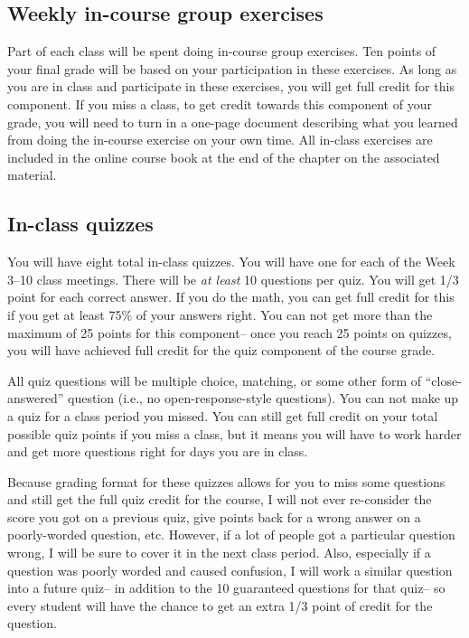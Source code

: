 \documentclass[]{book}
\begin{document}
\hypertarget{weekly-in-course-group-exercises}{%
\subsection{Weekly in-course group exercises}\label{weekly-in-course-group-exercises}}

Part of each class will be spent doing in-course group exercises. Ten points of your final grade will be based on your participation in these exercises. As long as you are in class and participate in these exercises, you will get full credit for this component. If you miss a class, to get credit towards this component of your grade, you will need to turn in a one-page document describing what you learned from doing the in-course exercise on your own time. All in-class exercises are included in the online course book at the end of the chapter on the associated material.

\hypertarget{in-class-quizzes}{%
\subsection{In-class quizzes}\label{in-class-quizzes}}

You will have eight total in-class quizzes. You will have one for each of the Week 3--10 class meetings. There will be \emph{at least} 10 questions per quiz. You will get 1/3 point for each correct answer. If you do the math, you can get full credit for this if you get at least 75\% of your answers right. You can not get more than the maximum of 25 points for this component-- once you reach 25 points on quizzes, you will have achieved full credit for the quiz component of the course grade.

All quiz questions will be multiple choice, matching, or some other form of ``close-answered'' question (i.e., no open-response-style questions). You can not make up a quiz for a class period you missed. You can still get full credit on your total possible quiz points if you miss a class, but it means you will have to work harder and get more questions right for days you are in class.

Because grading format for these quizzes allows for you to miss some questions and still get the full quiz credit for the course, I will not ever re-consider the score you got on a previous quiz, give points back for a wrong answer on a poorly-worded question, etc. However, if a lot of people got a particular question wrong, I will be sure to cover it in the next class period. Also, especially if a question was poorly worded and caused confusion, I will work a similar question into a future quiz-- in addition to the 10 guaranteed questions for that quiz-- so every student will have the chance to get an extra 1/3 point of credit for the question.
\end{document}
